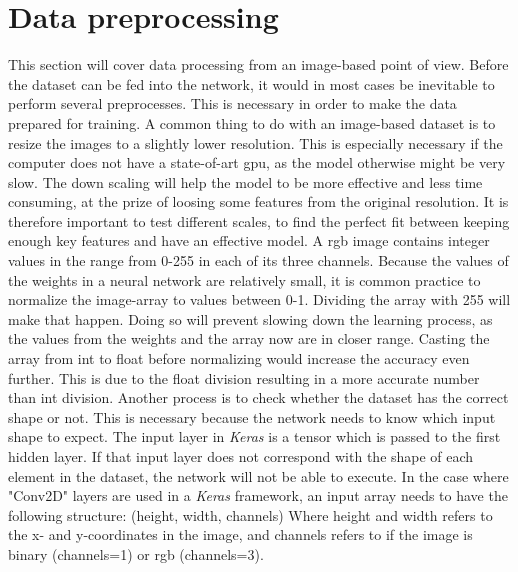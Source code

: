 \documentclass[USenglish]{ifimaster}  %
\begin{document}
\section{Data preprocessing}
This section will cover data processing from an image-based point of view. Before the dataset can be fed into the network, it would in most cases be inevitable to perform several preprocesses. This is necessary in order to make the data prepared for training. 
\newline
A common thing to do with an image-based dataset is to resize the images to a slightly lower resolution. This is especially necessary if the computer does not have a state-of-art \ac{gpu}, as the model otherwise might be very slow. The down scaling will help the model to be more effective and less time consuming, at the prize of loosing some features from the original resolution. It is therefore important to test different scales, to find the perfect fit between keeping enough key features and have an effective model.
\newline
A \ac{rgb} image contains integer values in the range from 0-255 in each of its three channels. Because the values of the weights in a neural network are relatively small, it is common practice to normalize the image-array to values between 0-1. Dividing the array with 255 will make that happen. Doing so will prevent slowing down the learning process, as the values from the weights and the array now are in closer range. Casting the array from int to float before normalizing would increase the accuracy even further. This is due to the float division resulting in a more accurate number than int division.
\newline
\newline
Another process is to check whether the dataset has the correct shape or not. This is necessary because the network needs to know which input shape to expect. The input layer in \textit{Keras} is a tensor which is passed to the first hidden layer. If that input layer does not correspond with the shape of each element in the dataset, the network will not be able to execute. In the case where "Conv2D" layers are used in a \textit{Keras} framework, an input array needs to have the following structure:
\newline
\newline
(height, width, channels)
\newline
\newline
Where height and width refers to the x- and y-coordinates in the image, and channels refers to if the image is binary (channels=1) or \ac{rgb} (channels=3).
\end{document}
